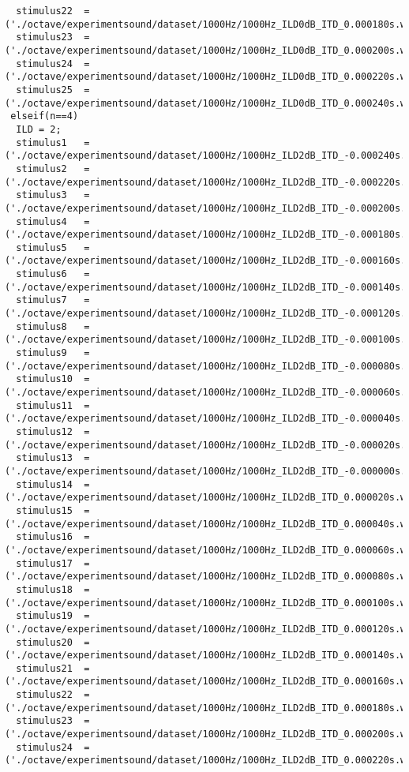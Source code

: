 {\begin{verbatim}
  stimulus22  =('./octave/experimentsound/dataset/1000Hz/1000Hz_ILD0dB_ITD_0.000180s.wav');
  stimulus23  =('./octave/experimentsound/dataset/1000Hz/1000Hz_ILD0dB_ITD_0.000200s.wav');
  stimulus24  =('./octave/experimentsound/dataset/1000Hz/1000Hz_ILD0dB_ITD_0.000220s.wav');
  stimulus25  =('./octave/experimentsound/dataset/1000Hz/1000Hz_ILD0dB_ITD_0.000240s.wav');
 elseif(n==4)
  ILD = 2;
  stimulus1   =('./octave/experimentsound/dataset/1000Hz/1000Hz_ILD2dB_ITD_-0.000240s.wav');
  stimulus2   =('./octave/experimentsound/dataset/1000Hz/1000Hz_ILD2dB_ITD_-0.000220s.wav');
  stimulus3   =('./octave/experimentsound/dataset/1000Hz/1000Hz_ILD2dB_ITD_-0.000200s.wav');
  stimulus4   =('./octave/experimentsound/dataset/1000Hz/1000Hz_ILD2dB_ITD_-0.000180s.wav');
  stimulus5   =('./octave/experimentsound/dataset/1000Hz/1000Hz_ILD2dB_ITD_-0.000160s.wav');
  stimulus6   =('./octave/experimentsound/dataset/1000Hz/1000Hz_ILD2dB_ITD_-0.000140s.wav');
  stimulus7   =('./octave/experimentsound/dataset/1000Hz/1000Hz_ILD2dB_ITD_-0.000120s.wav');
  stimulus8   =('./octave/experimentsound/dataset/1000Hz/1000Hz_ILD2dB_ITD_-0.000100s.wav');
  stimulus9   =('./octave/experimentsound/dataset/1000Hz/1000Hz_ILD2dB_ITD_-0.000080s.wav');
  stimulus10  =('./octave/experimentsound/dataset/1000Hz/1000Hz_ILD2dB_ITD_-0.000060s.wav');
  stimulus11  =('./octave/experimentsound/dataset/1000Hz/1000Hz_ILD2dB_ITD_-0.000040s.wav');
  stimulus12  =('./octave/experimentsound/dataset/1000Hz/1000Hz_ILD2dB_ITD_-0.000020s.wav');
  stimulus13  =('./octave/experimentsound/dataset/1000Hz/1000Hz_ILD2dB_ITD_-0.000000s.wav');
  stimulus14  =('./octave/experimentsound/dataset/1000Hz/1000Hz_ILD2dB_ITD_0.000020s.wav');
  stimulus15  =('./octave/experimentsound/dataset/1000Hz/1000Hz_ILD2dB_ITD_0.000040s.wav');
  stimulus16  =('./octave/experimentsound/dataset/1000Hz/1000Hz_ILD2dB_ITD_0.000060s.wav');
  stimulus17  =('./octave/experimentsound/dataset/1000Hz/1000Hz_ILD2dB_ITD_0.000080s.wav');
  stimulus18  =('./octave/experimentsound/dataset/1000Hz/1000Hz_ILD2dB_ITD_0.000100s.wav');
  stimulus19  =('./octave/experimentsound/dataset/1000Hz/1000Hz_ILD2dB_ITD_0.000120s.wav');
  stimulus20  =('./octave/experimentsound/dataset/1000Hz/1000Hz_ILD2dB_ITD_0.000140s.wav');
  stimulus21  =('./octave/experimentsound/dataset/1000Hz/1000Hz_ILD2dB_ITD_0.000160s.wav');
  stimulus22  =('./octave/experimentsound/dataset/1000Hz/1000Hz_ILD2dB_ITD_0.000180s.wav');
  stimulus23  =('./octave/experimentsound/dataset/1000Hz/1000Hz_ILD2dB_ITD_0.000200s.wav');
  stimulus24  =('./octave/experimentsound/dataset/1000Hz/1000Hz_ILD2dB_ITD_0.000220s.wav');

\end{verbatim}}
